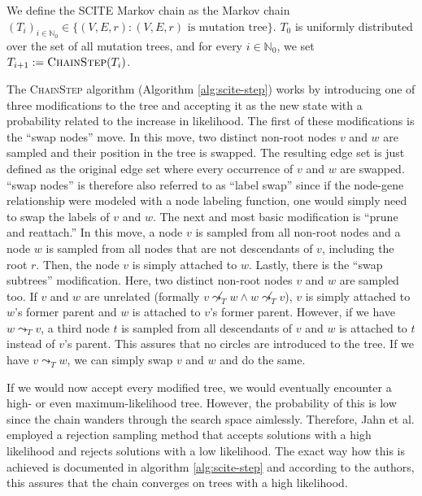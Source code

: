 \begin{definition}
    We define the \ac{SCITE} Markov chain as the Markov chain $(T_i)_{i \in \mathbb{N}_0} \in \{(V, E, r) : (V, E, r) \text{ is mutation tree}\}$. $T_0$ is uniformly distributed over the set of all mutation trees, and for every $i \in \mathbb{N}_0$, we set $T_{i+1} := \textsc{ChainStep}(T_i)$.
\end{definition}

The \textsc{ChainStep} algorithm (Algorithm \ref{alg:scite-step}) works by introducing one of three modifications to the tree and accepting it as the new state with a probability related to the increase in likelihood. The first of these modifications is the ``swap nodes'' move. In this move, two distinct non-root nodes $v$ and $w$ are sampled and their position in the tree is swapped. The resulting edge set is just defined as the original edge set where every occurrence of $v$ and $w$ are swapped. ``swap nodes'' is therefore also referred to as ``label swap'' since if the node-gene relationship were modeled with a node labeling function, one would simply need to swap the labels of $v$ and $w$. The next and most basic modification is ``prune and reattach.'' In this move, a node $v$ is sampled from all non-root nodes and a node $w$ is sampled from all nodes that are not descendants of $v$, including the root $r$. Then, the node $v$ is simply attached to $w$. Lastly, there is the ``swap subtrees'' modification. Here, two distinct non-root nodes $v$ and $w$ are sampled too. If $v$ and $w$ are unrelated (formally $v \not\leadsto_T w \wedge w \not\leadsto_T v$), $v$ is simply attached to $w$'s former parent and $w$ is attached to $v$'s former parent. However, if we have $w \leadsto_T v$, a third node $t$ is sampled from all descendants of $v$ and $w$ is attached to $t$ instead of $v$'s parent. This assures that no circles are introduced to the tree. If we have $v \leadsto_T w$, we can simply swap $v$ and $w$ and do the same.

If we would now accept every modified tree, we would eventually encounter a high- or even maximum-likelihood tree. However, the probability of this is low since the chain wanders through the search space aimlessly. Therefore, Jahn et al. employed a rejection sampling method that accepts solutions with a high likelihood and rejects solutions with a low likelihood. The exact way how this is achieved is documented in algorithm \ref{alg:scite-step} and according to the authors, this assures that the chain converges on trees with a high likelihood.
    
